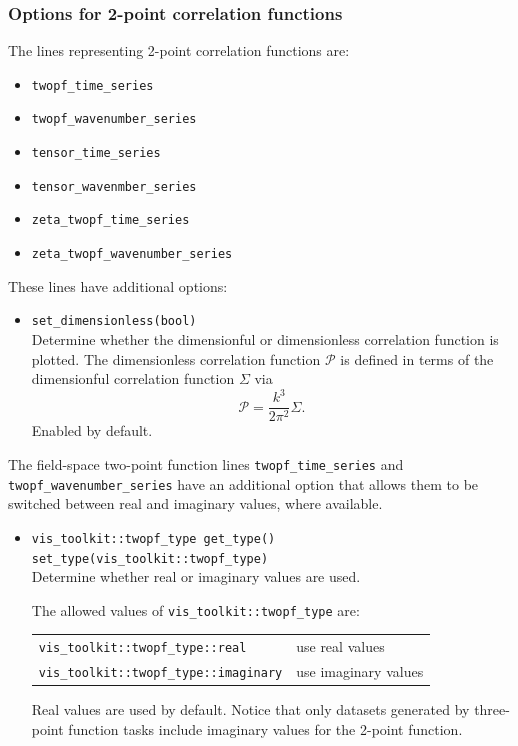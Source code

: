 \documentclass[11pt,a4paper]{article}
\newcommand{\DimlessSigma}{\mathcal{P}}
\begin{document}
\subsubsection{Options for 2-point correlation functions}
The lines representing 2-point correlation functions are:
\begin{itemize}
    \item \texttt{twopf_time_series}
    \item \texttt{twopf_wavenumber_series}
    \item \texttt{tensor_time_series}
    \item \texttt{tensor_wavenmber_series}
    \item \texttt{zeta_twopf_time_series}
    \item \texttt{zeta_twopf_wavenumber_series}
\end{itemize}
These lines
have additional options:
\begin{itemize}        
    \item \texttt{set_dimensionless(bool)} \\
    Determine whether the dimensionful or dimensionless correlation
    function is plotted.
    The dimensionless correlation function $\DimlessSigma$ is defined
    in terms of the dimensionful correlation function $\Sigma$
    via
    \begin{equation}
        \DimlessSigma = \frac{k^3}{2\pi^2} \Sigma .
    \end{equation}
    Enabled by default.
\end{itemize}
The field-space two-point function lines
\texttt{twopf_time_series}
and \texttt{twopf_wavenumber_series} have an additional option that
allows them to be switched between
real and imaginary values, where available.
\begin{itemize}
    \item \texttt{vis_toolkit::twopf_type get_type()} \\
    \texttt{set_type(vis_toolkit::twopf_type)} \\
    Determine whether real or imaginary values are used.
    
    The allowed values
    of \texttt{vis_toolkit::twopf_type} are: \\
    \begin{tabular}{p{6.5cm}p{7.5cm}}
        \texttt{vis_toolkit::twopf_type::real} & use real values \\
        \texttt{vis_toolkit::twopf_type::imaginary} & use imaginary values    
    \end{tabular}
    Real values are used by default.
    Notice that only datasets generated by three-point function tasks
    include imaginary values for the 2-point function.
\end{itemize}
\end{document}
